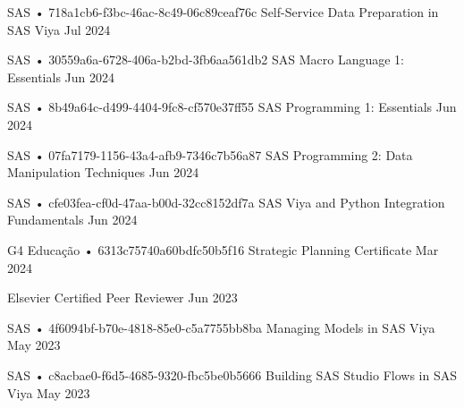 \begin{cventries}
  \cventry
    {SAS • 718a1cb6-f3bc-46ac-8c49-06c89ceaf76c} %
    {Self-Service Data Preparation in SAS Viya} %
    {} %
    {Jul 2024} %
    {}

  \cventry
    {SAS • 30559a6a-6728-406a-b2bd-3fb6aa561db2} %
    {SAS Macro Language 1: Essentials} %
    {} %
    {Jun 2024} %
    {}

  \cventry
    {SAS • 8b49a64c-d499-4404-9fc8-cf570e37ff55} %
    {SAS Programming 1: Essentials} %
    {} %
    {Jun 2024} %
    {}

  \cventry
    {SAS • 07fa7179-1156-43a4-afb9-7346c7b56a87} %
    {SAS Programming 2: Data Manipulation Techniques} %
    {} %
    {Jun 2024} %
    {}

  \cventry
    {SAS • cfe03fea-cf0d-47aa-b00d-32cc8152df7a} %
    {SAS Viya and Python Integration Fundamentals} %
    {} %
    {Jun 2024} %
    {}

  \cventry
    {G4 Educação • 6313c75740a60bdfc50b5f16} %
    {Strategic Planning Certificate} %
    {} %
    {Mar 2024} %
    {}

  \cventry
    {Elsevier} %
    {Certified Peer Reviewer} %
    {} %
    {Jun 2023} %
    {}

  \cventry
    {SAS • 4f6094bf-b70e-4818-85e0-c5a7755bb8ba} %
    {Managing Models in SAS Viya} %
    {} %
    {May 2023} %
    {}

  \cventry
    {SAS • c8acbae0-f6d5-4685-9320-fbc5be0b5666} %
    {Building SAS Studio Flows in SAS Viya} %
    {} %
    {May 2023} %
    {}


\end{cventries}
